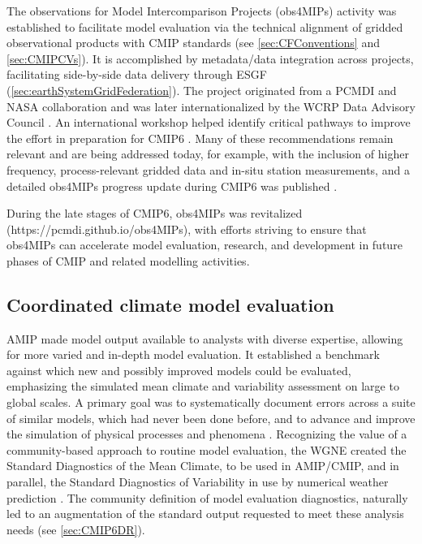 \documentclass[manuscript]{copernicus}
\begin{document}
The observations for Model Intercomparison Projects (obs4MIPs) activity was established to facilitate model evaluation via the technical alignment of gridded observational products with CMIP standards (see \autoref{sec:CFConventions} and \autoref{sec:CMIPCVs}). It is accomplished by metadata/data integration across projects, facilitating side-by-side data delivery through ESGF (\autoref{sec:earthSystemGridFederation}). The project originated from a PCMDI and NASA collaboration \citep{gleckler_improving_2011} and was later internationalized by the WCRP Data Advisory Council \citep[WDAC;][]{teixeira_satellite_2014}. An international workshop helped identify critical pathways to improve the effort in preparation for CMIP6 \citep{ferraro_evolving_2015}. Many of these recommendations remain relevant and are being addressed today, for example, with the inclusion of higher frequency, process-relevant gridded data and in-situ station measurements, and a detailed obs4MIPs progress update during CMIP6 was published \citep{waliser_observations_2020}.

During the late stages of CMIP6, obs4MIPs was revitalized (https://pcmdi.github.io/obs4MIPs), with efforts striving to ensure that obs4MIPs can accelerate model evaluation, research, and development in future phases of CMIP and related modelling activities. 


\subsection{Coordinated climate model evaluation}
\label{sec:CMIP6SupportingProjects-CoordEval}

AMIP made model output available to analysts with diverse expertise, allowing for more varied and in-depth model evaluation. It established a benchmark against which new and possibly improved models could be evaluated, emphasizing the simulated mean climate and variability assessment on large to global scales. A primary goal was to systematically document errors across a suite of similar models, which had never been done before, and to advance and improve the simulation of physical processes and phenomena \citep{gates_ams_1992}. Recognizing the value of a community-based approach to routine model evaluation, the WGNE created the Standard Diagnostics of the Mean Climate, to be used in AMIP/CMIP, and in parallel, the Standard Diagnostics of Variability in use by numerical weather prediction \citep[e.g.,][p. 10]{wmo_world_climate_research_programme_report_2003}. The community definition of model evaluation diagnostics, naturally led to an augmentation of the standard output requested to meet these analysis needs (see \autoref{sec:CMIP6DR}).
\end{document}
